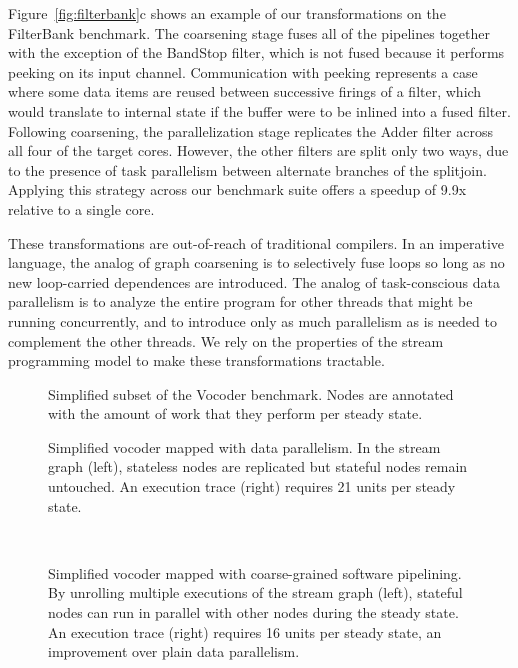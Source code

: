Figure~\ref{fig:filterbank}c shows an example of our
transformations on the FilterBank benchmark.  The coarsening stage
fuses all of the pipelines together with the exception of the BandStop
filter, which is not fused because it performs peeking on its input
channel.  Communication with peeking represents a case where some data
items are reused between successive firings of a filter, which would
translate to internal state if the buffer were to be inlined into a
fused filter.  Following coarsening, the parallelization stage
replicates the Adder filter across all four of the target cores.
However, the other filters are split only two ways, due to the
presence of task parallelism between alternate branches of the
splitjoin.  Applying this strategy across our benchmark suite offers a
speedup of 9.9x relative to a single core.

These transformations are out-of-reach of traditional compilers.  In
an imperative language, the analog of graph coarsening is to
selectively fuse loops so long as no new loop-carried dependences are
introduced.  The analog of task-conscious data parallelism is to
analyze the entire program for other threads that might be running
concurrently, and to introduce only as much parallelism as is needed
to complement the other threads.  We rely on the properties of the
stream programming model to make these transformations tractable.

\begin{figure}[t]
\centering
{}
\caption[Simplified subset of the Vocoder benchmark.]{Simplified subset
  of the Vocoder benchmark.  Nodes are annotated with the amount of
  work that they perform per steady state.\protect\label{fig:vocoder}}
\end{figure}

\begin{figure}[t!]
\centering
{}
\caption[Coarse-grained data parallelism applied to
  Vocoder.]{Simplified vocoder mapped with data parallelism.  In the
  stream graph (left), stateless nodes are replicated but stateful
  nodes remain untouched.  An execution trace (right) requires 21
  units per steady state.\protect\label{fig:vocoder-data}}

~ \\ \vspace{6pt}
\caption[Coarse-grained software pipelining applied to
  Vocoder.]{Simplified vocoder mapped with coarse-grained software
  pipelining.  By unrolling multiple executions of the stream graph
  (left), stateful nodes can run in parallel with other nodes during
  the steady state.  An execution trace (right) requires 16 units per
  steady state, an improvement over plain data parallelism.
  \protect\label{fig:vocoder-swpipe}}
\end{figure}

